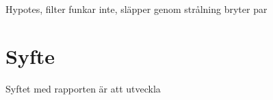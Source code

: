 \documentclass[main.tex]{subfiles}
\begin{document}
Hypotes, filter funkar inte, släpper genom strålning bryter par




\section{Syfte}
Syftet med rapporten är att utveckla 

\end{document}
